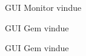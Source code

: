 \begin{figure}[H]
	\centering
	\caption{GUI  Monitor vindue}
	\label{fig:GUI  Monitor vindue}
\end{figure}

\begin{figure}[H]
	\centering
	\caption{GUI  Gem vindue}
	\label{fig:GUI  Gem vindue}
\end{figure}

\begin{figure}[H]
	\centering
	\caption{GUI  Gem vindue}
	\label{fig:GUI  Gem vindue}
\end{figure}









